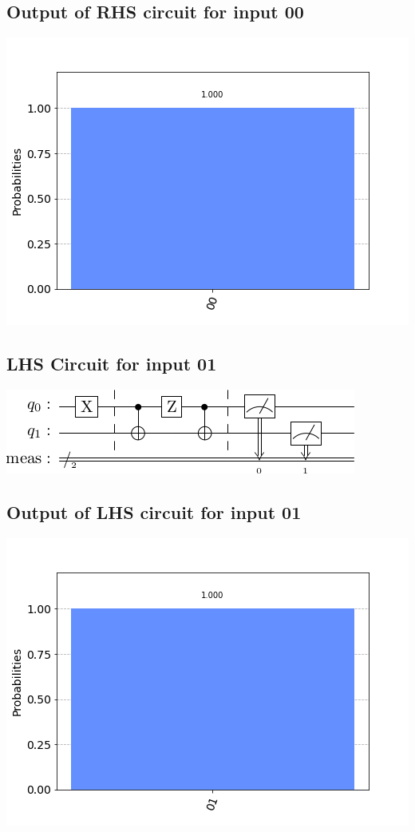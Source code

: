 \documentclass[a4paper]{article}
\begin{document}
\begin{answer}[Question 1 b (b)]
        \subsection*{Output of RHS circuit for input 00}
        \includegraphics[scale = 0.5]{b200-out.png}
        \subsection*{LHS Circuit for input 01}
        \includegraphics[scale=0.5]{b101.png}
        \subsection*{Output of LHS circuit for input 01}
        \includegraphics[scale = 0.5]{b101-out.png}

\end{answer}
\end{document}
